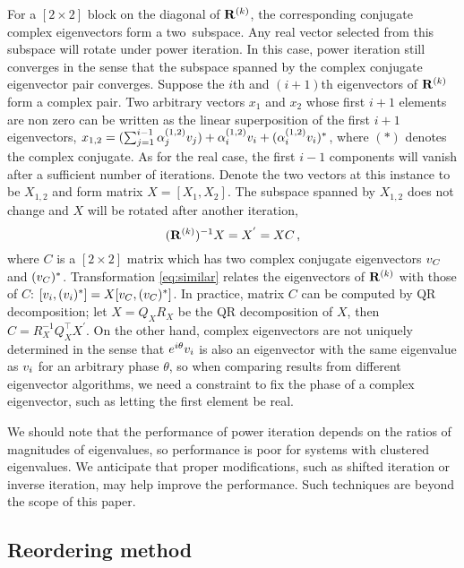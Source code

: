For a $[2\!\times\! 2]$ block on the diagonal of $\mathbf{R}^{(k)}$, the
corresponding conjugate complex eigenvectors form a two\dmn\ subspace.
Any real vector selected from this subspace will rotate under power
iteration. In this case, power iteration still converges in the sense
that the subspace spanned by the complex
conjugate eigenvector pair converges.
Suppose the $i$th and $(i+1)$th eigenvectors of $\mathbf{R}^{(k)}$ form a
complex pair. Two arbitrary vectors $x_{1}$ and $x_{2}$ whose first $i+1$
elements are non zero can be written as the linear superposition of the
first $i+1$ eigenvectors,
$x_{1,2}=(\sum_{j=1}^{i-1}\alpha^{(1,2)}_{j}v_{j})+\alpha^{(1,2)}_{i}v_{i}+
(\alpha^{(1,2)}_{i}v_{i})^{*}
$,
where $(*)$ denotes the complex conjugate. As for the real case, the
first $i\!-\!1$ components will vanish after a sufficient number of
iterations. Denote the two vectors at this instance to be $X_{1, 2}$
and form matrix $X=[X_{1},X_{2}]$.
The subspace spanned by $X_{1,2}$ does not change and $X$ will be rotated
after another iteration,
\begin{equation}
  (\mathbf{R}^{(k)})^{-1}X=X^{'}=XC
  \,,
  \label{eq:similar}
\end{equation}
where $C$ is a $[2\!\times\! 2]$ matrix which has two complex conjugate
eigenvectors $v_{C}$ and $(v_{C})^{*}$. Transformation
\eqref{eq:similar} relates the eigenvectors of $\mathbf{R}^{(k)}$ with those of
$C$: $[v_{i},(v_{i})^{*}]=X[v_{C},(v_{C})^{*}]$.
In practice, matrix $C$ can be computed by QR decomposition; let
$X=Q_{X}R_{X}$ be the QR decomposition of $X$, then
$C=R_{X}^{-1}Q_{X}^\top X^{'}$.
On the other hand,
complex eigenvectors are not uniquely determined in the sense that
$e^{i\theta}v_{i}$ is also an eigenvector with the same eigenvalue
as $v_{i}$ for an arbitrary {phase} $\theta$, so when comparing
results from different eigenvector algorithms, we need a constraint to
fix the phase of a complex eigenvector, such as letting the first element
be real.

We should note that the performance of power iteration depends on the ratios
of magnitudes of eigenvalues, so performance is poor for systems with
clustered eigenvalues. We {anticipate that proper modifications,
  such as shifted iteration or inverse iteration, may help
  improve the performance}.
Such techniques are beyond the scope of this paper.

\subsection{Reordering method}
\label{sect:reorder}

